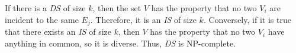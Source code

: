 \documentclass{article}
\begin{document}
\hfill

If there is a \emph{DS} of size $k$, then the set $V$ has the property that no two $V_i$ are incident to the same $E_j$. Therefore, it is an \emph{IS} of size $k$. Conversely, if it is true that there exists an \emph{IS} of size $k$, then $V$ has the property that no two $V_i$ have anything in common, so it is diverse. Thus, \emph{DS} is NP-complete.

\newpage
 

\end{document}
